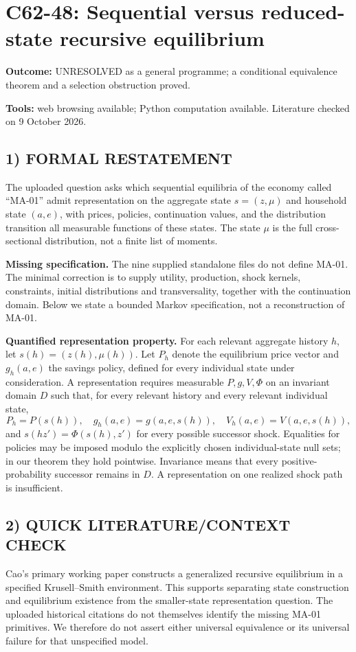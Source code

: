\documentclass[11pt,a4paper]{article}
\theoremstyle{definition}
\begin{document}
\section*{C62-48: Sequential versus reduced-state recursive equilibrium}
\textbf{Outcome:} UNRESOLVED as a general programme; a conditional equivalence theorem and a selection obstruction proved.\par\textbf{Tools:} web browsing available; Python computation available. Literature checked on 9 October 2026.
\subsection*{1) FORMAL RESTATEMENT}
The uploaded question asks which sequential equilibria of the economy called ``MA-01'' admit representation on the aggregate state $s=(z,\mu)$ and household state $(a,e)$, with prices, policies, continuation values, and the distribution transition all measurable functions of these states. The state $\mu$ is the full cross-sectional distribution, not a finite list of moments.

\textbf{Missing specification.} The nine supplied standalone files do not define MA-01. The minimal correction is to supply utility, production, shock kernels, constraints, initial distributions and transversality, together with the continuation domain. Below we state a bounded Markov specification, not a reconstruction of MA-01.

\textbf{Quantified representation property.} For each relevant aggregate history $h$, let $s(h)=(z(h),\mu(h))$. Let $P_h$ denote the equilibrium price vector and $g_h(a,e)$ the savings policy, defined for every individual state under consideration. A representation requires measurable $P,g,V,\Phi$ on an invariant domain $D$ such that, for every relevant history and every relevant individual state,
\[
 P_h=P(s(h)),\quad g_h(a,e)=g(a,e,s(h)),\quad
 V_h(a,e)=V(a,e,s(h)),
\]
and $s(hz')=\Phi(s(h),z')$ for every possible successor shock. Equalities for policies may be imposed modulo the explicitly chosen individual-state null sets; in our theorem they hold pointwise. Invariance means that every positive-probability successor remains in $D$. A representation on one realized shock path is insufficient.

\subsection*{2) QUICK LITERATURE/CONTEXT CHECK}
Cao's primary working paper \cite{Cao} constructs a generalized recursive equilibrium in a specified Krusell--Smith environment. This supports separating state construction and equilibrium existence from the smaller-state representation question. The uploaded historical citations do not themselves identify the missing MA-01 primitives. We therefore do not assert either universal equivalence or its universal failure for that unspecified model.
\end{document}
